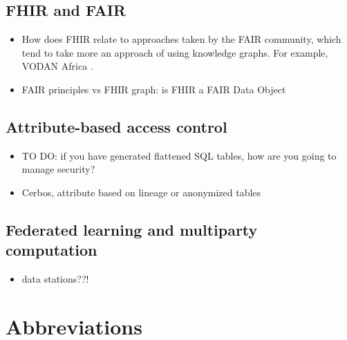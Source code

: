 \documentclass[
  authoryear]{elsarticle}
\providecommand{\tightlist}{%
  \setlength{\itemsep}{0pt}\setlength{\parskip}{0pt}}\usepackage{longtable,booktabs,array}
\begin{document}
\subsection{FHIR and FAIR}\label{fhir-and-fair}

\begin{itemize}
\tightlist
\item
  How does FHIR relate to approaches taken by the FAIR community, which
  tend to take more an approach of using knowledge graphs. For example,
  VODAN Africa \citep{gebreslassie2023fhir4fair, purnamajati2022data}.
\item
  FAIR principles vs FHIR graph: is FHIR a FAIR Data Object
\end{itemize}

\subsection{Attribute-based access
control}\label{attribute-based-access-control}

\begin{itemize}
\tightlist
\item
  TO DO: if you have generated flattened SQL tables, how are you going
  to manage security?
\item
  Cerbos, attribute based on lineage or anonymized tables
\end{itemize}

\subsection{Federated learning and multiparty
computation}\label{federated-learning-and-multiparty-computation}

\begin{itemize}
\tightlist
\item
  data stations??!
\end{itemize}

\section{Abbreviations}\label{abbreviations}
\end{document}
